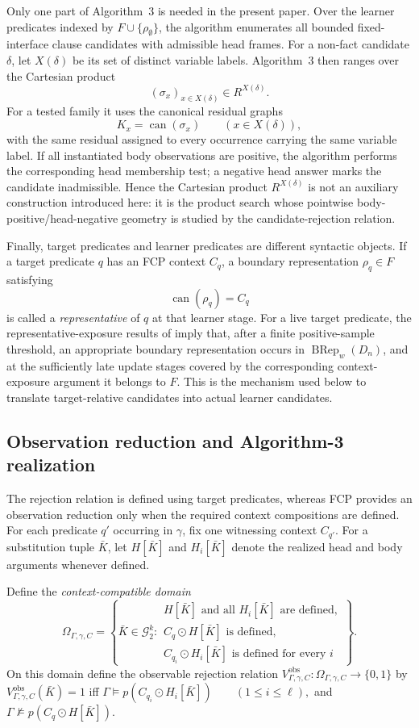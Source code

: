 \documentclass[11pt]{article}
\theoremstyle{definition}
\theoremstyle{remark}
\newcommand{\Gtwo}{\mathcal G_2}
\begin{document}
Only one part of Algorithm~3 is needed in the present paper.  Over the learner
predicates indexed by \(F\cup\{\rho_\emptyset\}\), the algorithm enumerates
all bounded fixed-interface clause candidates with admissible head frames.
For a non-fact candidate \(\delta\), let \(X(\delta)\) be its set of distinct
variable labels.  Algorithm~3 then ranges over the Cartesian product
\[
(\sigma_x)_{x\in X(\delta)}\in R^{X(\delta)}.
\]
For a tested family it uses the canonical residual graphs
\[
K_x=\operatorname{can}(\sigma_x)
\qquad(x\in X(\delta)),
\]
with the same residual assigned to every occurrence carrying the same variable
label.  If all instantiated body observations are positive, the algorithm
performs the corresponding head membership test; a negative head answer marks
the candidate inadmissible.  Hence the Cartesian product
\(R^{X(\delta)}\) is not an auxiliary construction introduced here: it is the
product search whose pointwise body-positive/head-negative geometry is studied
by the candidate-rejection relation.

Finally, target predicates and learner predicates are different syntactic
objects.  If a target predicate \(q\) has an FCP context \(C_q\), a boundary
representation \(\rho_q\in F\) satisfying
\[
\operatorname{can}(\rho_q)=C_q
\]
is called a \emph{representative} of \(q\) at that learner stage.  For a live
target predicate, the representative-exposure results of
\cite{ShoudaiEtAl2026} imply that, after a finite positive-sample threshold, an
appropriate boundary representation occurs in
\(\operatorname{BRep}_w(D_n)\), and at the sufficiently late update stages
covered by the corresponding context-exposure argument it belongs to \(F\).
This is the mechanism used below to translate target-relative candidates into
actual learner candidates.

\subsection{Observation reduction and Algorithm-3 realization}

The rejection relation is defined using target predicates, whereas FCP
provides an observation reduction only when the required context compositions
are defined. For each predicate \(q'\) occurring in \(\gamma\), fix one
witnessing context \(C_{q'}\). For a substitution tuple \(\bar K\), let
\(H[\bar K]\) and \(H_i[\bar K]\) denote the realized head and body arguments
whenever defined.

Define the \emph{context-compatible domain}
\[
\Omega_{\Gamma,\gamma,C}
=
\left\{
\bar K\in\Gtwo^k:
\begin{array}{l}
H[\bar K]\text{ and all }H_i[\bar K]\text{ are defined},\\
C_q\odot H[\bar K]\text{ is defined},\\
C_{q_i}\odot H_i[\bar K]\text{ is defined for every }i
\end{array}
\right\}.
\]
On this domain define the observable rejection relation
\(V^{\mathrm{obs}}_{\Gamma,\gamma,C}: \Omega_{\Gamma,\gamma,C}\to\{0,1\}\)
by \(V^{\mathrm{obs}}_{\Gamma,\gamma,C}(\bar K)=1\) iff
\(\Gamma\models p(C_{q_i}\odot H_i[\bar K]) \qquad(1\le i\le\ell),\)
and
\(\Gamma\not\models p(C_q\odot H[\bar K]).\)
\end{document}
